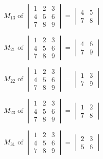 \documentclass[11pt]{article}
\begin{document}
\begin{displaymath}
M_{13} \text{ of }
\begin{vmatrix}
1 & 2 & 3 \\
4 & 5 & 6 \\
7 & 8 & 9
\end{vmatrix} = \begin{vmatrix}
4 & 5 \\
7 & 8
\end{vmatrix}
\end{displaymath}

\begin{displaymath}
M_{21} \text{ of }
\begin{vmatrix}
1 & 2 & 3 \\
4 & 5 & 6 \\
7 & 8 & 9
\end{vmatrix} = \begin{vmatrix}
4 & 6 \\
7 & 9
\end{vmatrix}
\end{displaymath}

\begin{displaymath}
M_{22} \text{ of }
\begin{vmatrix}
1 & 2 & 3 \\
4 & 5 & 6 \\
7 & 8 & 9
\end{vmatrix} = \begin{vmatrix}
1 & 3 \\
7 & 9
\end{vmatrix}
\end{displaymath}

\begin{displaymath}
M_{23} \text{ of }
\begin{vmatrix}
1 & 2 & 3 \\
4 & 5 & 6 \\
7 & 8 & 9
\end{vmatrix} = \begin{vmatrix}
1 & 2 \\
7 & 8
\end{vmatrix}
\end{displaymath}

\begin{displaymath}
M_{31} \text{ of }
\begin{vmatrix}
1 & 2 & 3 \\
4 & 5 & 6 \\
7 & 8 & 9
\end{vmatrix} = \begin{vmatrix}
2 & 3 \\
5 & 6
\end{vmatrix}
\end{displaymath}
\end{document}

